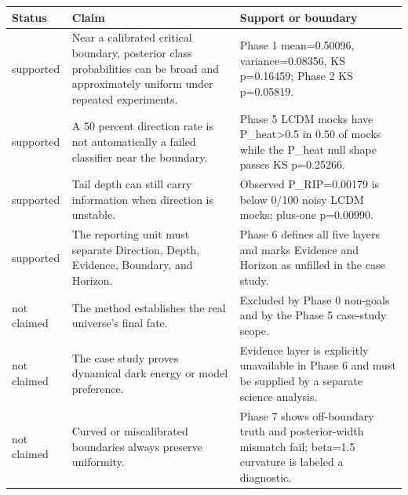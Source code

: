 \documentclass[
]{article}
\newcounter{none} %
\begin{document}
{\def\LTcaptype{none} %
\begin{longtable}[]{@{}
  >{\raggedright\arraybackslash}p{}
  >{\raggedright\arraybackslash}p{}
  >{\raggedright\arraybackslash}p{}@{}}
\toprule\noalign{}
\begin{minipage}[b]{\linewidth}\raggedright
Status
\end{minipage} & \begin{minipage}[b]{\linewidth}\raggedright
Claim
\end{minipage} & \begin{minipage}[b]{\linewidth}\raggedright
Support or boundary
\end{minipage} \\
\midrule\noalign{}
\endhead
\bottomrule\noalign{}
\endlastfoot
supported & Near a calibrated critical boundary, posterior class
probabilities can be broad and approximately uniform under repeated
experiments. & Phase 1 mean=0.50096, variance=0.08356, KS p=0.16459;
Phase 2 KS p=0.05819. \\
supported & A 50 percent direction rate is not automatically a failed
classifier near the boundary. & Phase 5 LCDM mocks have
P\_heat\textgreater0.5 in 0.50 of mocks while the P\_heat null shape
passes KS p=0.25266. \\
supported & Tail depth can still carry information when direction is
unstable. & Observed P\_RIP=0.00179 is below 0/100 noisy LCDM mocks;
plus-one p=0.00990. \\
supported & The reporting unit must separate Direction, Depth, Evidence,
Boundary, and Horizon. & Phase 6 defines all five layers and marks
Evidence and Horizon as unfilled in the case study. \\
not claimed & The method establishes the real universe's final fate. &
Excluded by Phase 0 non-goals and by the Phase 5 case-study scope. \\
not claimed & The case study proves dynamical dark energy or model
preference. & Evidence layer is explicitly unavailable in Phase 6 and
must be supplied by a separate science analysis. \\
not claimed & Curved or miscalibrated boundaries always preserve
uniformity. & Phase 7 shows off-boundary truth and posterior-width
mismatch fail; beta=1.5 curvature is labeled a diagnostic. \\
\end{longtable}
}
\end{document}
